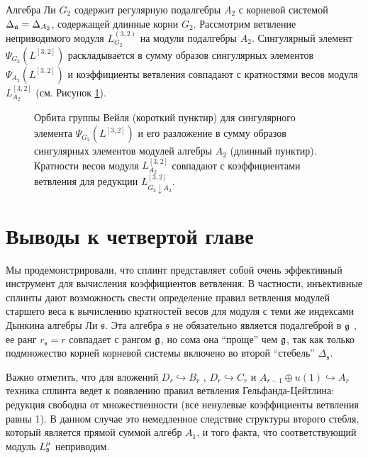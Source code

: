 \vspace{10mm}
\begin{example}
  Алгебра Ли  $G_{2}$ содержит регулярную подалгебры  $A_{2}$ с корневой системой $\Delta_{\mathfrak{a}}=\Delta_{A_{2}}$, содержащей длинные корни $G_{2}$. Рассмотрим ветвление неприводимого модуля $L_{G_{2}}^{(3,2)}$ на модули подалгебры $A_{2}$. Сингулярный элемент $\Psi_{G_{2}}(L^{[3,2]})$ раскладывается в сумму образов сингулярных элементов  $\Psi_{A_{2}}(L^{[3,2]})$ и коэффициенты ветвления совпадают с кратностями весов модуля $L^{[3,2]}_{A_{2}}$ (см. Рисунок \ref{fig:g2_splint}).


  \begin{figure}[h!bt]
  \noindent\centering{
   \texttt{[image: g2]}
  }

  \caption{Орбита группы Вейля  (короткий пунктир) для сингулярного элемента  $\Psi_{G_{2}}(L^{[3,2]})$ и его разложение в сумму образов сингулярных элементов модулей алгебры $A_{2}$ (длинный пунктир). Кратности весов модуля $L^{[3,2]}_{A_{2}}$ совпадают с коэффициентами ветвления для редукции $L^{[3,2]}_{G_{2}\downarrow A_{2}}$.}


 \label{fig:g2_splint}
\end{figure}

\end{example}

\section{Выводы к четвертой главе}

\label{sec:conclusions}
Мы продемонстрировали, что сплинт представляет собой очень эффективный инструмент для вычисления коэффициентов ветвления.  В частности, инъективные сплинты дают возможность свести определение правил ветвления модулей старшего веса к вычислению кратностей весов для модуля с теми же индексами Дынкина алгебры Ли $\mathfrak{s}$. Эта алгебра $\mathfrak{s}$ не обязательно является подалгеброй в  $\mathfrak{g}$ , ее ранг $r_{\mathfrak{s}}=r$ совпадает с рангом $\mathfrak{g}$, но сома она ``проще'' чем  $\mathfrak{g}$, так как только подмножество корней корневой системы включено во второй ``стебель''  $\Delta_{\mathfrak{s}}$.

Важно отметить, что для вложений  $D_{r}\hookrightarrow B_{r}$ , $D_{r}\hookrightarrow C_{r}$ и $A_{r-1}\oplus u\left( 1\right) \hookrightarrow A_{r}$ техника сплинта ведет к появлению правил ветвления Гельфанда-Цейтлина: редукция свободна от множественности (все ненулевые коэффициенты ветвления равны 1). В данном случае это немедленное следствие структуры второго стебля, который является прямой суммой алгебр $A_{1}$, и того факта, что соответствующий модуль $L_{\mathfrak{s}}^{\mu }$ неприводим.


